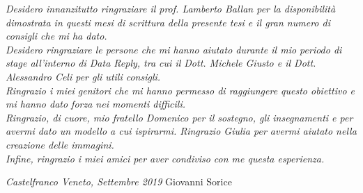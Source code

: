 




\noindent \textit{Desidero innanzitutto ringraziare il prof. Lamberto Ballan per la disponibilità dimostrata in questi mesi di scrittura della presente tesi e il gran numero di consigli che mi ha dato.}\\

\noindent \textit{Desidero ringraziare le persone che mi hanno aiutato durante il mio periodo di stage all'interno di Data Reply, tra cui il Dott. Michele Giusto e il Dott. Alessandro Celi per gli utili consigli.}\\

\noindent \textit{Ringrazio i miei genitori che mi hanno permesso di raggiungere questo obiettivo e mi hanno dato forza nei momenti difficili.}\\

\noindent \textit{Ringrazio, di cuore, mio fratello Domenico per il sostegno, gli insegnamenti e per avermi dato un modello a cui ispirarmi. Ringrazio Giulia per avermi aiutato nella creazione delle immagini.}\\

\noindent \textit{Infine, ringrazio i miei amici per aver condiviso con me questa esperienza.}\\
\bigskip

\noindent\textit{Castelfranco Veneto, Settembre 2019}
\hfill Giovanni Sorice
